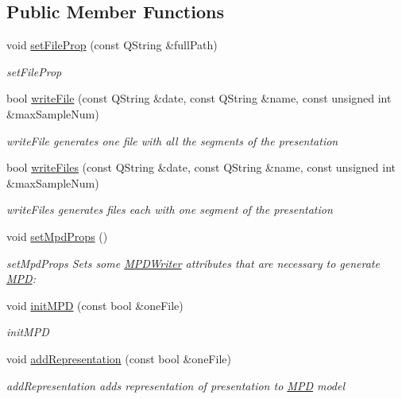 \subsection*{Public Member Functions}
\begin{DoxyCompactItemize}
\item 
void \hyperlink{class_dash_wrapper_ae8755ff621924e486fced209ec64da8c}{set\-File\-Prop} (const Q\-String \&full\-Path)
\begin{DoxyCompactList}\small\item\em set\-File\-Prop \end{DoxyCompactList}\item 
bool \hyperlink{class_dash_wrapper_a6b005fe59242d1458b82354688ec6ecc}{write\-File} (const Q\-String \&date, const Q\-String \&name, const unsigned int \&max\-Sample\-Num)
\begin{DoxyCompactList}\small\item\em write\-File generates one file with all the segments of the presentation \end{DoxyCompactList}\item 
bool \hyperlink{class_dash_wrapper_afeccc99b561708539e29480b67ddb088}{write\-Files} (const Q\-String \&date, const Q\-String \&name, const unsigned int \&max\-Sample\-Num)
\begin{DoxyCompactList}\small\item\em write\-Files generates files each with one segment of the presentation \end{DoxyCompactList}\item 
void \hyperlink{class_dash_wrapper_a38bc9dc1273981e4ad3c141c4f3fc100}{set\-Mpd\-Props} ()
\begin{DoxyCompactList}\small\item\em set\-Mpd\-Props Sets some \hyperlink{class_m_p_d_writer}{M\-P\-D\-Writer} attributes that are necessary to generate \hyperlink{class_m_p_d}{M\-P\-D}\-: \end{DoxyCompactList}\item 
void \hyperlink{class_dash_wrapper_a2161004570a7a6f15602aa22f9f51fc6}{init\-M\-P\-D} (const bool \&one\-File)
\begin{DoxyCompactList}\small\item\em init\-M\-P\-D \end{DoxyCompactList}\item 
void \hyperlink{class_dash_wrapper_aa19d0c7e44cd86a17773b2b2d6e4c3e9}{add\-Representation} (const bool \&one\-File)
\begin{DoxyCompactList}\small\item\em add\-Representation adds representation of presentation to \hyperlink{class_m_p_d}{M\-P\-D} model \end{DoxyCompactList}\item 

\end{DoxyCompactItemize}
